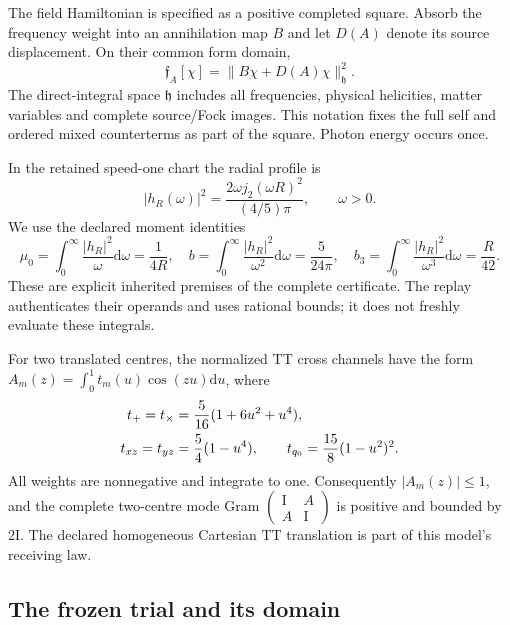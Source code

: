 \documentclass[11pt]{article}
\theoremstyle{definition}
\newcommand{\Id}{\mathrm I}
\newcommand{\dd}{\mathrm d}
\begin{document}
The field Hamiltonian is specified as a positive completed square. Absorb the frequency weight into an annihilation map $B$ and let $D(A)$ denote its source displacement. On their common form domain,
\begin{equation}\label{eq:fieldform}
 \mathfrak f_A[\chi]=\|B\chi+D(A)\chi\|_{\mathfrak h}^2.
\end{equation}
The direct-integral space $\mathfrak h$ includes all frequencies, physical helicities, matter variables and complete source/Fock images. This notation fixes the full self and ordered mixed counterterms as part of the square. Photon energy occurs once.

In the retained speed-one chart the radial profile is
\begin{equation}\label{eq:profile}
 |h_R(\omega)|^2=\frac{2\omega j_2(\omega R)^2}{(4/5)\pi},\qquad\omega>0.
\end{equation}
We use the declared moment identities
\begin{equation}\label{eq:moments}
 \mu_0=\int_0^\infty\frac{|h_R|^2}{\omega}\dd\omega=\frac1{4R},\quad
 b=\int_0^\infty\frac{|h_R|^2}{\omega^2}\dd\omega=\frac5{24\pi},\quad
 b_3=\int_0^\infty\frac{|h_R|^2}{\omega^3}\dd\omega=\frac R{42}.
\end{equation}
These are explicit inherited premises of the complete certificate. The replay authenticates their operands and uses rational bounds; it does not freshly evaluate these integrals.

For two translated centres, the normalized TT cross channels have the form $A_m(z)=\int_0^1t_m(u)\cos(zu)\dd u$, where
\begin{align}\label{eq:tt}
 t_+=t_\times&=\frac5{16}(1+6u^2+u^4),\notag\\
 t_{xz}=t_{yz}&=\frac54(1-u^4),\qquad
 t_{q_0}=\frac{15}{8}(1-u^2)^2.
\end{align}
All weights are nonnegative and integrate to one. Consequently $|A_m(z)|\leq1$, and the complete two-centre mode Gram $\left(\begin{smallmatrix}\Id&A\\A&\Id\end{smallmatrix}\right)$ is positive and bounded by $2\Id$. The declared homogeneous Cartesian TT translation is part of this model's receiving law.

\subsection{The frozen trial and its domain}
\end{document}

